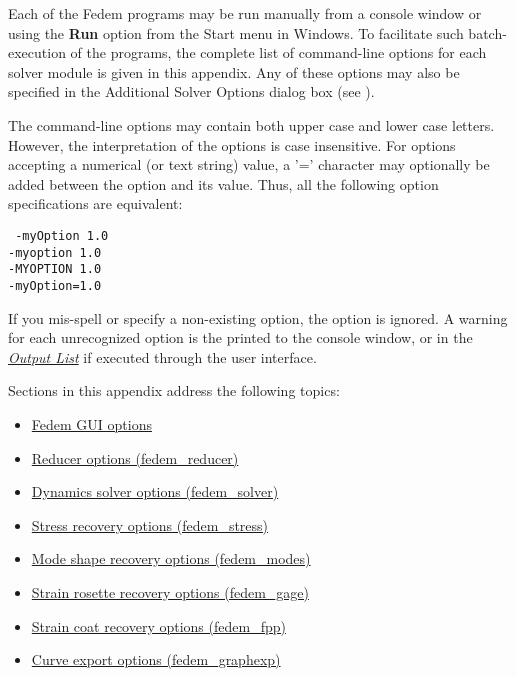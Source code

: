 %
%

%
%


Each of the Fedem programs may be run manually from a console window or using
the \textbf{Run} option from the {\sf Start} menu in Windows.
To facilitate such batch-execution of the programs,
the complete list of command-line options for each solver module is
given in this appendix. Any of these options may also be specified in
the Additional Solver Options dialog box (see
).

The command-line options may contain both upper case and lower case letters.
However, the interpretation of the options is case insensitive.
For options accepting a numerical (or text string) value, a '='
character may optionally be added between the option and its value.
Thus, all the following option specifications are equivalent:

{\tt
-myOption 1.0 \\[\parskip]
-myoption 1.0 \\[\parskip]
-MYOPTION 1.0 \\[\parskip]
-myOption=1.0}

If you mis-spell or specify a non-existing option, the option is ignored.
A warning for each unrecognized option is the printed to the console window,
or in the \protect\hyperlink{output-list}{\sl Output List}
if executed through the user interface.

Sections in this appendix address the following topics:

\begin{itemize}
\item
  \protect\hyperlink{fedem-gui-options}
                    {Fedem GUI options}
\item
  \protect\hyperlink{reducer-options}
                    {Reducer options (fedem\_reducer)}
\item
  \protect\hyperlink{solver-options}
                    {Dynamics solver options (fedem\_solver)}
\item
  \protect\hyperlink{stress-options}
                    {Stress recovery options (fedem\_stress)}
\item
  \protect\hyperlink{mode-options}
                    {Mode shape recovery options (fedem\_modes)}
\item
  \protect\hyperlink{gage-options}
                    {Strain rosette recovery options (fedem\_gage)}
\item
  \protect\hyperlink{strain-coat-options}
                    {Strain coat recovery options (fedem\_fpp)}
\item
  \protect\hyperlink{curve-export-options}
                    {Curve export options (fedem\_graphexp)}
\end{itemize}


